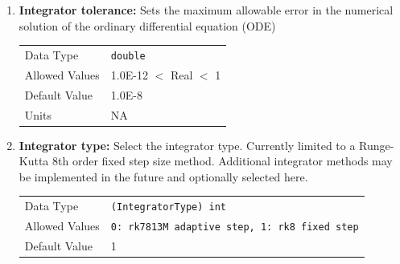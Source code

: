     \begin{enumerate}

        \item \textbf{Integrator tolerance:} Sets the maximum allowable error in the numerical solution of the ordinary differential equation (ODE)
        
            \begin{table}[H]
                \hspace{2cm}
                \begin{tabular}{ll}
                Data Type & \verb|double| \\
                Allowed Values & 1.0E-12 $<$ Real $<$ 1 \\
                Default Value & 1.0E-8 \\
                Units & NA
                \end{tabular}
            \end{table}

        \item \textbf{Integrator type:} Select the integrator type. Currently limited to a Runge-Kutta 8th order fixed step size method. Additional integrator methods may be implemented in the future and optionally selected here.
        
            \begin{table}[H]
                \hspace{2cm}
                \begin{tabular}{ll}
                Data Type & \verb|(IntegratorType) int| \\
                Allowed Values & \verb|0: rk7813M adaptive step, 1: rk8 fixed step|  \\
                Default Value & 1 \\
                \end{tabular}
            \end{table}

        

\end{enumerate}
